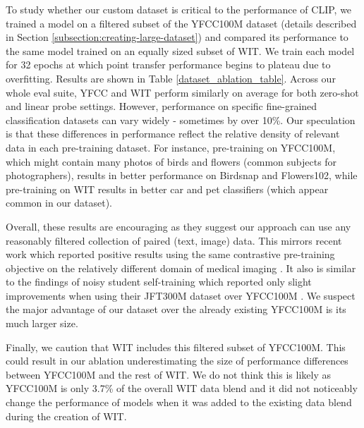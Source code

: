 \documentclass{article}
\begin{document}
To study whether our custom dataset is critical to the performance of CLIP, we trained a model on a filtered subset of the YFCC100M dataset (details described in Section \ref{subsection:creating-large-dataset}) and compared its performance to the same model trained on an equally sized subset of WIT. We train each model for 32 epochs at which point transfer performance begins to plateau due to overfitting. Results are shown in Table \ref{dataset_ablation_table}. Across our whole eval suite, YFCC and WIT perform similarly on average for both zero-shot and linear probe settings. However, performance on specific fine-grained classification datasets can vary widely - sometimes by over 10\%. Our speculation is that these differences in performance reflect the relative density of relevant data in each pre-training dataset. For instance, pre-training on YFCC100M, which might contain many photos of birds and flowers (common subjects for photographers), results in better performance on Birdsnap and Flowers102, while pre-training on WIT results in better car and pet classifiers (which appear common in our dataset).

Overall, these results are encouraging as they suggest our approach can use any reasonably filtered collection of paired (text, image) data. This mirrors recent work which reported positive results using the same contrastive pre-training objective on the relatively different domain of medical imaging \cite{zhang2020contrastive}. It also is similar to the findings of noisy student self-training which reported only slight improvements when using their JFT300M dataset over YFCC100M \cite{xie2020self}. We suspect the major advantage of our dataset over the already existing YFCC100M is its much larger size. 

Finally, we caution that WIT includes this filtered subset of YFCC100M. This could result in our ablation underestimating the size of performance differences between YFCC100M and the rest of WIT. We do not think this is likely as YFCC100M is only 3.7\% of the overall WIT data blend and it did not noticeably change the performance of models when it was added to the existing data blend during the creation of WIT.

\newcommand*\rot{\rotatebox{90}}
\newcommand{\xa}{\makebox[0pt][l]{$^a$}}
\newcommand{\xb}{\makebox[0pt][l]{$^b$}}
\newcommand{\xc}{\makebox[0pt][l]{$^c$}}
\newcommand{\xd}{\makebox[0pt][l]{$^d$}}
\newcommand{\xe}{\makebox[0pt][l]{$^e$}}
\newcommand{\xf}{\makebox[0pt][l]{$^f$}}
\newcommand{\xg}{\makebox[0pt][l]{$^g$}}
\newcommand{\xh}{\makebox[0pt][l]{$^h$}}
\newcommand{\xxi}{\makebox[0pt][l]{$^i$}}
\end{document}
